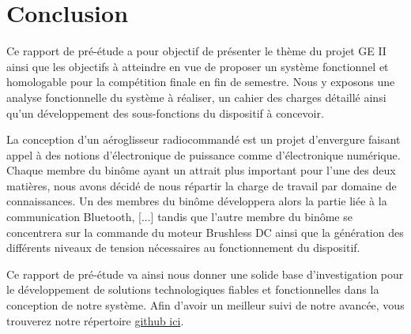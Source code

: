 \documentclass[a4paper,12pt]{report}
\begin{document}
	\section{Conclusion}
	
	Ce rapport de pré-étude a pour objectif de présenter le thème du projet GE II ainsi que les objectifs à atteindre en vue de proposer un système fonctionnel et homologable pour la compétition finale en fin de semestre. Nous y exposons une analyse fonctionnelle du système à réaliser, un cahier des charges détaillé ainsi qu'un développement des sous-fonctions du dispositif à concevoir.
	
	La conception d'un aéroglisseur radiocommandé est un projet d'envergure faisant appel à des notions d'électronique de puissance comme d'électronique numérique. Chaque membre du binôme ayant un attrait plus important pour l'une des deux matières, nous avons décidé de nous répartir la charge de travail par domaine de connaissances. Un des membres du binôme développera alors la partie liée à la communication Bluetooth, [...] tandis que l'autre membre du binôme se concentrera sur la commande du moteur Brushless DC ainsi que la génération des différents niveaux de tension nécessaires au fonctionnement du dispositif.
	
	Ce rapport de pré-étude va ainsi nous donner une solide base d'investigation pour le développement de solutions technologiques fiables et fonctionnelles dans la conception de notre système. Afin d'avoir un meilleur suivi de notre avancée, vous trouverez notre répertoire \href{https://github.com/tristanplouz/ProjetGE2}{github ici}.
	
\end{document}
